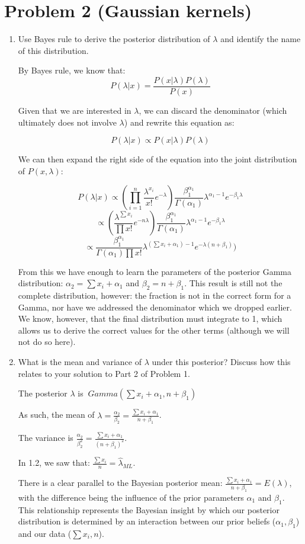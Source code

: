\documentclass[11pt]{article}
\begin{document}
\section*{Problem 2 (Gaussian kernels)}

\begin{enumerate}
\item Use Bayes rule to derive the posterior distribution of $\lambda$ and identify the name of this distribution.

By Bayes rule, we know that:
\[
P(\lambda | x) = \frac{P(x | \lambda) P(\lambda)}{P(x)}
\]

Given that we are interested in $\lambda$, we can discard the denominator (which ultimately does not involve $\lambda$) and rewrite this equation as:

\[
P(\lambda | x) \propto P(x | \lambda) P(\lambda)
\]

We can then expand the right side of the equation into the joint distribution of $P(x, \lambda)$:

\[
P(\lambda | x) \propto  (\prod_{i=1}^{n} \frac{\lambda^{x_i}}{x!} e^{-\lambda}) \frac{\beta_1^{\alpha_1}}{\Gamma(\alpha_1)} \lambda^{\alpha_1 - 1} e^{-\beta_1 \lambda}
\]
\[
\propto  (\frac{\lambda^{\sum x_i}}{\prod x!} e^{-n\lambda}) \frac{\beta_1^{\alpha_1}}{\Gamma(\alpha_1)} \lambda^{\alpha_1 - 1} e^{-\beta_1 \lambda}
\]
\[
\propto  \frac{\beta_1^{\alpha_1}}{\Gamma(\alpha_1) \prod x!} \lambda^{(\sum x_i + \alpha_1) - 1} e^{-\lambda (n + \beta_1)})
\]

From this we have enough to learn the parameters of the posterior Gamma distribution: $\alpha_2 = \sum x_i + \alpha_1$ and $\beta_2 = n + \beta_1$. This result is still not the complete distribution, however: the fraction is not in the correct form for a Gamma, nor have we addressed the denominator which we dropped earlier. We know, however, that the final distribution must integrate to 1, which allows us to derive the correct values for the other terms (although we will not do so here).

\item What is the mean and variance of $\lambda$ under this posterior? Discuss how this relates to your solution to Part 2 of Problem 1.

The posterior $\lambda$ is $~Gamma(\sum x_i + \alpha_1, n + \beta_1)$

As such, the mean of $\lambda = \frac{\alpha_2}{\beta_2} = \frac{\sum x_i + \alpha_1}{n + \beta_1}$.

The variance is $\frac{\alpha_2}{\beta_2^2} = \frac{\sum x_i + \alpha_1}{(n + \beta_1)^2}$.

In 1.2, we saw that: $\frac{\sum x_i}{n} = \hat \lambda_{ML}$.

There is a clear parallel to the Bayesian posterior mean: $\frac{\sum x_i + \alpha_1}{n + \beta_1} = E(\lambda)$, with the difference being the influence of the prior parameters $\alpha_1$ and $\beta_1$. This relationship represents the Bayesian insight by which our posterior distribution is determined by an interaction between our prior beliefs ($\alpha_1, \beta_1$) and our data ($\sum x_i, n$).

\end{enumerate}
\end{document}

